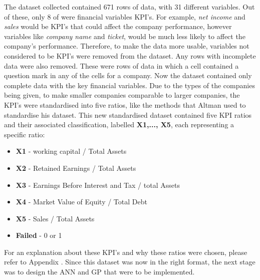 \documentclass[11pt]{article}
\begin{document}
The dataset collected contained 671 rows of data, with 31 different variables. Out of these, only 8 of were financial variables KPI's. For example, \textit{net income} and \textit{sales} would be KPI's that could affect the company performance, however variables like \textit{company name} and \textit{ticket}, would be much less likely to affect the company's performance. Therefore, to make the data more usable, variables not considered to be KPI's were removed from the dataset. Any rows with incomplete data were also removed. These were rows of data in which a cell contained a question mark in any of the cells for a company. Now the dataset contained only complete data with the key financial variables. Due to the types of the companies being given, to make smaller companies comparable to larger companies, the KPI's were standardised into five ratios, like the methods that Altman used to standardise his dataset. This new standardised dataset contained five KPI ratios and their associated classification, labelled \textbf{X1,..., X5}, each representing a specific ratio:
\begin{center}
	\begin{minipage}{.6\textwidth}
		\begin{itemize}
			\item[] \textbf{X1} - working capital / Total Assets
			\item[] \textbf{X2} - Retained Earnings / Total Assets
			\item[] \textbf{X3} - Earnings Before Interest and Tax / total Assets
			\item[] \textbf{X4} - Market Value of Equity / Total Debt
			\item[] \textbf{X5} - Sales / Total Assets
			\item[] \textbf{Failed} - 0 or 1
		\end{itemize}
	\end{minipage}
\end{center}
For an explanation about these KPI's and why these ratios were chosen, please refer to Appendix \cite{?}.
Since this dataset was now in the right format, the next stage was to design the ANN and GP that were to be implemented. 
\end{document}
